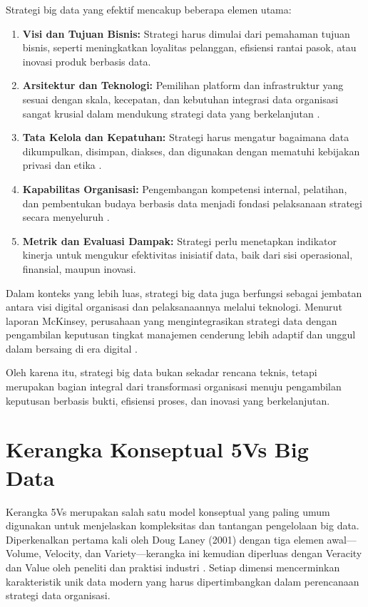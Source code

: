 Strategi big data yang efektif mencakup beberapa elemen utama:
\begin{enumerate}
	\item \textbf{Visi dan Tujuan Bisnis:} Strategi harus dimulai dari pemahaman tujuan bisnis, seperti meningkatkan loyalitas pelanggan, efisiensi rantai pasok, atau inovasi produk berbasis data.
	
	\item \textbf{Arsitektur dan Teknologi:} Pemilihan platform dan infrastruktur yang sesuai dengan skala, kecepatan, dan kebutuhan integrasi data organisasi sangat krusial dalam mendukung strategi data yang berkelanjutan \cite{ekambaram2021}.
	
	\item \textbf{Tata Kelola dan Kepatuhan:} Strategi harus mengatur bagaimana data dikumpulkan, disimpan, diakses, dan digunakan dengan mematuhi kebijakan privasi dan etika \cite{otieno2021}.
	
	\item \textbf{Kapabilitas Organisasi:} Pengembangan kompetensi internal, pelatihan, dan pembentukan budaya berbasis data menjadi fondasi pelaksanaan strategi secara menyeluruh \cite{lewis2021}.
	
	\item \textbf{Metrik dan Evaluasi Dampak:} Strategi perlu menetapkan indikator kinerja untuk mengukur efektivitas inisiatif data, baik dari sisi operasional, finansial, maupun inovasi.
\end{enumerate}

Dalam konteks yang lebih luas, strategi big data juga berfungsi sebagai jembatan antara visi digital organisasi dan pelaksanaannya melalui teknologi. Menurut laporan McKinsey, perusahaan yang mengintegrasikan strategi data dengan pengambilan keputusan tingkat manajemen cenderung lebih adaptif dan unggul dalam bersaing di era digital \cite{mckinsey2016}.

Oleh karena itu, strategi big data bukan sekadar rencana teknis, tetapi merupakan bagian integral dari transformasi organisasi menuju pengambilan keputusan berbasis bukti, efisiensi proses, dan inovasi yang berkelanjutan.

\section{Kerangka Konseptual 5Vs Big Data}

Kerangka 5Vs merupakan salah satu model konseptual yang paling umum digunakan untuk menjelaskan kompleksitas dan tantangan pengelolaan big data. Diperkenalkan pertama kali oleh Doug Laney (2001) dengan tiga elemen awal—Volume, Velocity, dan Variety—kerangka ini kemudian diperluas dengan Veracity dan Value oleh peneliti dan praktisi industri \cite{laney2001, gandomi2015}. Setiap dimensi mencerminkan karakteristik unik data modern yang harus dipertimbangkan dalam perencanaan strategi data organisasi.

